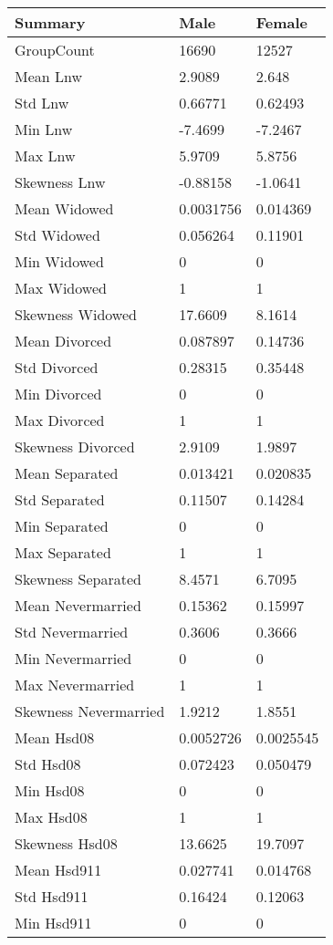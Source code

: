 \begin{tabular}{lll}
Summary & Male & Female \\ 
\hline 
GroupCount & 16690 & 12527 \\ 
Mean Lnw & 2.9089 & 2.648 \\ 
Std Lnw & 0.66771 & 0.62493 \\ 
Min Lnw & -7.4699 & -7.2467 \\ 
Max Lnw & 5.9709 & 5.8756 \\ 
Skewness Lnw & -0.88158 & -1.0641 \\ 
Mean Widowed & 0.0031756 & 0.014369 \\ 
Std Widowed & 0.056264 & 0.11901 \\ 
Min Widowed & 0 & 0 \\ 
Max Widowed & 1 & 1 \\ 
Skewness Widowed & 17.6609 & 8.1614 \\ 
Mean Divorced & 0.087897 & 0.14736 \\ 
Std Divorced & 0.28315 & 0.35448 \\ 
Min Divorced & 0 & 0 \\ 
Max Divorced & 1 & 1 \\ 
Skewness Divorced & 2.9109 & 1.9897 \\ 
Mean Separated & 0.013421 & 0.020835 \\ 
Std Separated & 0.11507 & 0.14284 \\ 
Min Separated & 0 & 0 \\ 
Max Separated & 1 & 1 \\ 
Skewness Separated & 8.4571 & 6.7095 \\ 
Mean Nevermarried & 0.15362 & 0.15997 \\ 
Std Nevermarried & 0.3606 & 0.3666 \\ 
Min Nevermarried & 0 & 0 \\ 
Max Nevermarried & 1 & 1 \\ 
Skewness Nevermarried & 1.9212 & 1.8551 \\ 
Mean Hsd08 & 0.0052726 & 0.0025545 \\ 
Std Hsd08 & 0.072423 & 0.050479 \\ 
Min Hsd08 & 0 & 0 \\ 
Max Hsd08 & 1 & 1 \\ 
Skewness Hsd08 & 13.6625 & 19.7097 \\ 
Mean Hsd911 & 0.027741 & 0.014768 \\ 
Std Hsd911 & 0.16424 & 0.12063 \\ 
Min Hsd911 & 0 & 0 \\ 

\end{tabular}
